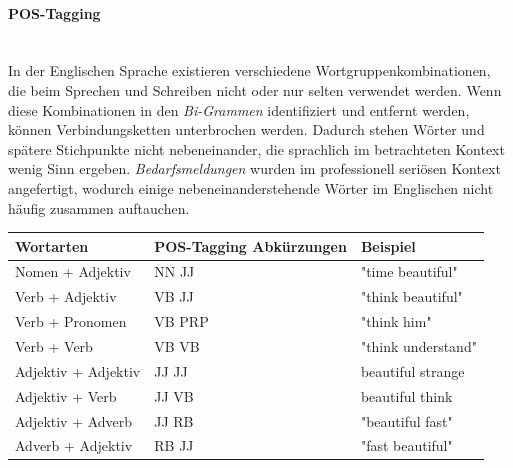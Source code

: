 \paragraph{POS-Tagging}\label{postagging} \mbox{}\\
In der Englischen Sprache existieren verschiedene Wortgruppenkombinationen, die beim Sprechen und Schreiben nicht oder nur selten verwendet werden. Wenn diese Kombinationen in den \emph{Bi-Grammen} identifiziert und entfernt werden, können Verbindungsketten unterbrochen werden. Dadurch stehen Wörter und spätere Stichpunkte nicht nebeneinander, die sprachlich im betrachteten Kontext wenig Sinn ergeben. \emph{Bedarfsmeldungen} wurden im professionell seriösen Kontext angefertigt, wodurch einige nebeneinanderstehende Wörter im Englischen nicht häufig zusammen auftauchen.
\begin{center}
	\begin{tabularx}{1\textwidth} { 
			| >{\raggedright\arraybackslash}X 
			| >{\raggedright\arraybackslash}X
			| >{\raggedright\arraybackslash}X | }
		\hline
		Wortarten & POS-Tagging Abkürzungen & Beispiel \\
		\hline
		\hline
		Nomen + Adjektiv & NN JJ & "time beautiful"\\
		\hline
		Verb + Adjektiv & VB JJ & "think beautiful"\\
		\hline
		Verb + Pronomen & VB PRP & "think him"\\
		\hline
		Verb + Verb & VB VB & "think understand"\\
		\hline
		Adjektiv + Adjektiv & JJ JJ & beautiful strange\\
		\hline
		Adjektiv + Verb & JJ VB & beautiful think\\
		\hline
		Adjektiv + Adverb & JJ RB & "beautiful fast"\\
		\hline
		Adverb + Adjektiv & RB JJ & "fast beautiful"\\
		\hline
	\end{tabularx}\\
	\label{tab:wortkombinationen}
\end{center}
